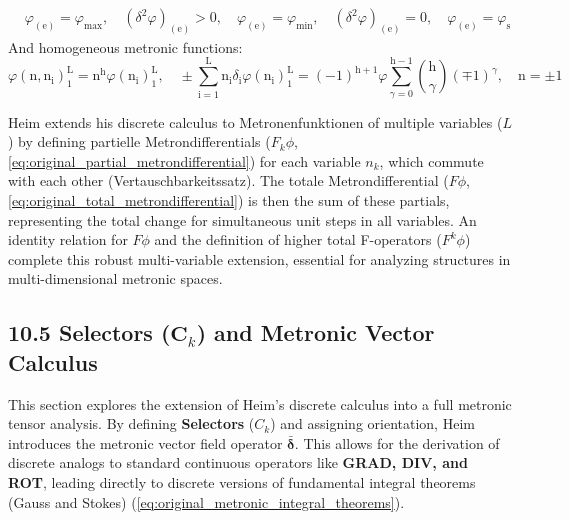 \documentclass[12pt]{article}
\begin{document}
\begin{itemize}
\begin{equation}
\begin{aligned}
    & \varphi_{(\mathrm{e})} = \varphi_{\mathrm{max}}, \quad \left(\delta^2\varphi\right)_{(\mathrm{e})} > 0, \quad \varphi_{(\mathrm{e})} = \varphi_{\mathrm{min}}, \quad \left(\delta^2\varphi\right)_{(\mathrm{e})} = 0, \quad \varphi_{(\mathrm{e})} = \varphi_{\mathrm{s}}
    \end{aligned} \tag{76}
    \end{equation}
    And homogeneous metronic functions:
    \begin{equation}
    \varphi(\mathrm{n}, \mathrm{n_i})_1^\mathrm{L} = \mathrm{n}^\mathrm{h}\varphi(\mathrm{n_i})_1^\mathrm{L}, \quad \pm \sum_{\mathrm{i=1}}^\mathrm{L} \mathrm{n_i} \delta_{\mathrm{i}}\varphi(\mathrm{n_i})_1^\mathrm{L} = (-1)^{\mathrm{h+1}} \varphi \sum_{\gamma=0}^{\mathrm{h-1}} \binom{\mathrm{h}}{\gamma} (\mp 1)^\gamma, \quad \mathrm{n} = \pm 1 \tag{77}
    \end{equation}
\end{itemize}

Heim extends his discrete calculus to Metronenfunktionen of multiple variables (\(L\)) by defining partielle Metrondifferentials (\(F_k\phi\), \eqref{eq:original_partial_metrondifferential}) for each variable \(n_k\), which commute with each other (Vertauschbarkeitssatz). The totale Metrondifferential (\(F\phi\), \eqref{eq:original_total_metrondifferential}) is then the sum of these partials, representing the total change for simultaneous unit steps in all variables. An identity relation for \(F\phi\) and the definition of higher total F-operators (\(F^k\phi\)) complete this robust multi-variable extension, essential for analyzing structures in multi-dimensional metronic spaces.


\subsection{10.5 Selectors (\texorpdfstring{\( \mathbf{C}_k \)}{C\_k}) and Metronic Vector Calculus}
\label{sec:selectors_vector_calculus}

This section explores the extension of Heim's discrete calculus into a full metronic tensor analysis. By defining \textbf{Selectors} (\(C_k\)) and assigning orientation, Heim introduces the metronic vector field operator \(\bar{\bm{\delta}}\). This allows for the derivation of discrete analogs to standard continuous operators like \textbf{GRAD, DIV, and ROT}, leading directly to discrete versions of fundamental integral theorems (Gauss and Stokes) (\eqref{eq:original_metronic_integral_theorems}).
\end{document}
